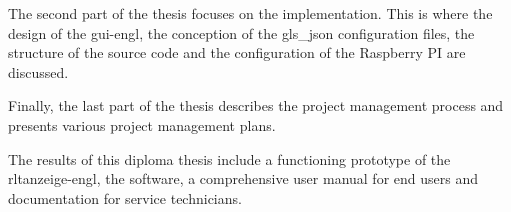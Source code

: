 The second part of the thesis focuses on the implementation. This is where the design of the \acf{gui-engl}, the conception of the \gls{gls_json} configuration files, the structure of the source code and the configuration of the Raspberry PI are discussed.

Finally, the last part of the thesis describes the project management process and presents various project management plans.

The results of this diploma thesis include a functioning prototype of the \ac{rltanzeige-engl}, the software, a comprehensive user manual for end users and documentation for service technicians.


